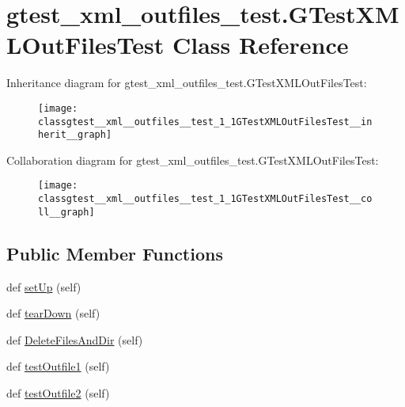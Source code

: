 \hypertarget{classgtest__xml__outfiles__test_1_1GTestXMLOutFilesTest}{}\section{gtest\+\_\+xml\+\_\+outfiles\+\_\+test.\+G\+Test\+X\+M\+L\+Out\+Files\+Test Class Reference}
\label{classgtest__xml__outfiles__test_1_1GTestXMLOutFilesTest}


Inheritance diagram for gtest\+\_\+xml\+\_\+outfiles\+\_\+test.\+G\+Test\+X\+M\+L\+Out\+Files\+Test\+:\nopagebreak
\begin{figure}[H]
\begin{center}
\leavevmode
\texttt{[image: classgtest\_\_xml\_\_outfiles\_\_test\_1\_1GTestXMLOutFilesTest\_\_inherit\_\_graph]}
\end{center}
\end{figure}


Collaboration diagram for gtest\+\_\+xml\+\_\+outfiles\+\_\+test.\+G\+Test\+X\+M\+L\+Out\+Files\+Test\+:\nopagebreak
\begin{figure}[H]
\begin{center}
\leavevmode
\texttt{[image: classgtest\_\_xml\_\_outfiles\_\_test\_1\_1GTestXMLOutFilesTest\_\_coll\_\_graph]}
\end{center}
\end{figure}
\subsection*{Public Member Functions}
\begin{DoxyCompactItemize}
\item 
def \hyperlink{classgtest__xml__outfiles__test_1_1GTestXMLOutFilesTest_a56550f293277d18c36e868a637fe1153}{set\+Up} (self)
\item 
def \hyperlink{classgtest__xml__outfiles__test_1_1GTestXMLOutFilesTest_a49d1d410370ba8a3cfcc281eaadb5706}{tear\+Down} (self)
\item 
def \hyperlink{classgtest__xml__outfiles__test_1_1GTestXMLOutFilesTest_a503d2fbc9cd782ae57ac4307d2db43e1}{Delete\+Files\+And\+Dir} (self)
\item 
def \hyperlink{classgtest__xml__outfiles__test_1_1GTestXMLOutFilesTest_a034738bbc00ac46d00f183402c561228}{test\+Outfile1} (self)
\item 
def \hyperlink{classgtest__xml__outfiles__test_1_1GTestXMLOutFilesTest_a3c02687f092a482d0d0260c7ed94c618}{test\+Outfile2} (self)
\end{DoxyCompactItemize}
